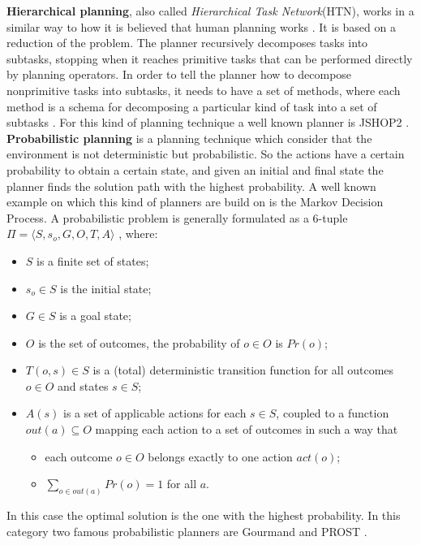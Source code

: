 \textbf{Hierarchical planning}, also called \textit{Hierarchical Task Network}(HTN), works in a similar way to how it is believed that human planning 
works \citep{marthi2007angelic}. It is based on a reduction of the problem. The planner recursively decomposes tasks into subtasks, stopping when it reaches primitive tasks that can be performed directly by planning operators. In order to tell the planner how to decompose nonprimitive tasks into subtasks, it needs to have a set of methods, where each method is a schema for decomposing a particular kind of task into a set of subtasks \citep{shopDescription}. For this kind of planning technique a well known planner is JSHOP2 \cite{JSHOP2}.
\textbf{Probabilistic planning} is a planning technique which consider that the environment is not deterministic but probabilistic. So the actions have a certain probability to obtain a certain state, and given an initial and final state the planner  finds the solution path with the highest probability. A well known example on which this kind of planners are build on is the Markov Decision Process. A probabilistic problem is generally formulated as a $6$-tuple $\Pi=\langle S, s_o, G, O, T, A \rangle$ \cite{little2007probabilistic}, where:
\begin{itemize}
\item $S$ is a finite set of states;
\item $s_o \in S$ is the initial state;
\item $G \in S$ is a goal state;
\item $O$ is the set of outcomes, the probability of $o \in O$ is $Pr(o)$;
\item $T(o,s) \in S$ is a (total) deterministic transition function for all outcomes $o \in O$ and states $s\in S$;
\item $A(s)$ is a set of applicable actions for each $s \in S$, coupled to a function $out(a) \subseteq O$ mapping each action to a set of outcomes in such a way that 
\begin{itemize}
\item each outcome $o \in O$ belongs exactly to one action $act(o)$;
\item $\sum_{o \in out(a)} Pr(o) = 1$ for all $a$.
\end{itemize}
\end{itemize}
In this case the optimal solution is the one with the highest probability. In this category two famous probabilistic planners are Gourmand \cite{Gourmand} and PROST \cite{PROST}.

